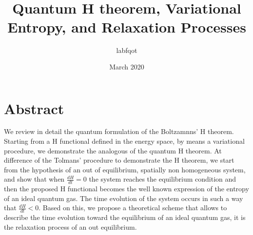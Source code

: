 \documentclass{article}
\title{Quantum H theorem, Variational Entropy, and Relaxation Processes}
\author{labfqot}
\date{March 2020}
\begin{document}
\maketitle

\section{Abstract}
We review in detail the quantum formulation of the Boltzamnns' H theorem. Starting from a H functional defined in the energy space, by means a variational procedure, we demonstrate the analogous of the quantum H theorem. At difference of the Tolmans' procedure to demonstrate the H theorem,  we start from the hypothesis of an out of equilibrium, spatially non homogeneous system, and show that when $\frac{dH}{dt}=0$ the system reaches the equilibrium condition and then the proposed H functional becomes the well known expression of the entropy of an ideal quantum gas. The time evolution of the system occurs in such a way that $\frac{dH}{dt}<0$. Based on this, we propose a theoretical scheme that allows to describe the time evolution toward the equilibrium of an ideal quantum gas, it is the relaxation process of an out equilibrium.


\end{document}
